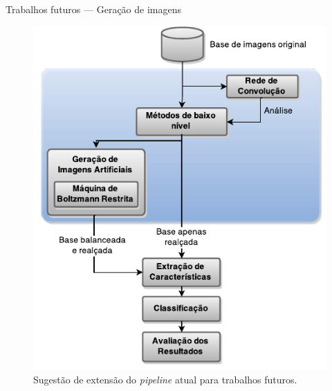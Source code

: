 \documentclass[10pt]{beamer}
\begin{document}
\begin{frame}{Trabalhos futuros --- Geração de imagens}
  \begin{figure}
    \includegraphics[height=0.75\textheight]{figuras/geral.pdf}
    \caption{Sugestão de extensão do \textit{pipeline} atual para trabalhos futuros.}
  \end{figure}
\end{frame}
\end{document}
